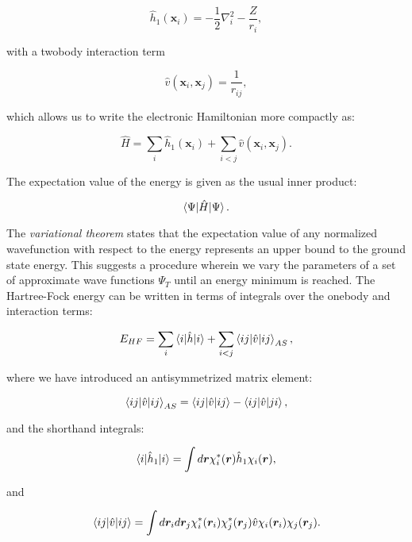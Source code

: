 \begin{equation}
 \hat{h}_1(\bm{x}_i) = -\frac{1}{2} \nabla_i^2
    -\frac{Z}{r_i} , 
\end{equation}

with a twobody interaction term

\begin{equation}
 \hat{v}(\bm{x}_i, \bm{x}_j) = \frac{1}{r_{ij}} , 
\end{equation}

which allows us to write the electronic Hamiltonian more compactly as:

\begin{equation}
 \hat{H} = \sum_i \hat{h}_1(\bm{x}_i)
    + \sum_{i < j} \hat{v}(\bm{x}_i, \bm{x}_j) .
\end{equation}

The expectation value of the energy is given as the usual inner product:

\begin{equation}
 \braket{\Psi | \hat{H} | \Psi} .
\end{equation}

The \textit{variational theorem} states that the expectation
value of any normalized wavefunction with respect to the energy
represents an upper bound to the ground state energy.
This suggests a procedure wherein we vary the parameters
of a set of approximate wave functions $\Psi_T$
until an energy minimum is reached.
The Hartree-Fock energy can be written in terms of integrals
over the onebody and interaction terms:

\begin{equation}
 E_{HF} = \sum_i \braket{i | \hat{h} | i}
    + \sum_{i < j} \braket{ij | \hat{v} | ij}_{AS} ,
\end{equation}

where we have introduced an antisymmetrized matrix element:

\begin{equation}
 \braket{ij | \hat{v} | ij}_{AS}
    = \braket{ij | \hat{v} | ij} - \braket{ij | \hat{v} | ji} , 
\end{equation}

and the shorthand integrals:

\begin{equation}
 \braket{i | \hat{h}_1 | i} =
    \int d\bm{r} \chi_i^*(\bm{r}) \hat{h}_1 \chi_i(\bm{r}) , 
\end{equation}

and

\begin{equation}
 \braket{ij | \hat{v} | ij} =
    \int d\bm{r}_i d\bm{r}_j \chi_i^*(\bm{r}_i) \chi_j^*(\bm{r}_j) 
    \hat{v} \chi_i(\bm{r}_i) \chi_j(\bm{r}_j) . 
\end{equation}

